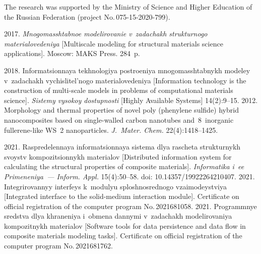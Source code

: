 
\vspace*{-16pt}

\Ack
\noindent
The research was supported by the Ministry of Science and Higher Education of the Russian 
Federation (project No.\,075-15-2020-799).





  \begin{multicols}{2}

\renewcommand{\bibname}{\protect\rmfamily References}

{\small\frenchspacing
 {%
 \begin{thebibliography}{9}
 2017. \textit{Mnogomasshtabnoe modelirovanie v~zadachakh strukturnogo 
materialovedeniya} [Multiscale modeling for structural materials science applications]. Moscow: 
MAKS Press. 284~p.

\vspace*{-2pt}

 2018. In\-for\-ma\-tsi\-on\-naya tekh\-no\-lo\-giya po\-stro\-eniya mno\-go\-mas\-shtab\-nykh 
mo\-de\-ley v~za\-da\-chakh vy\-chis\-li\-tel'\-no\-go ma\-te\-ri\-a\-lo\-ve\-de\-niya 
[Information technology is the construction 
of multi-scale models in problems of computational materials science]. \textit{Sistemy vysokoy 
dostupnosti} [Highly Available Systems] 14(2):9--15.
2012. Morphology and thermal properties of novel poly (phenylene sulfide) hybrid nanocomposites 
based on single-walled carbon nanotubes and~8~inorganic fullerene-like WS~2 nanoparticles. 
\textit{J.~Mater. Chem.}  
22(4):1418--1425.
{

}
   2021. 
  Ras\-pre\-de\-len\-naya in\-for\-ma\-tsi\-on\-naya sis\-te\-ma   dlya 
ras\-che\-ta struk\-tur\-nykh svoystv kom\-po\-zi\-tsi\-on\-nykh ma\-te\-ri\-alov 
[Distributed information system for 
calculating the structural properties of composite materials]. \textit{Informatika i~ee Primeneniya~--- 
Inform. Appl.} 15(4):50--58. doi: 10.14357/19922264210407.
   2021. In\-teg\-ri\-ro\-van\-nyy in\-ter\-feys k~mo\-du\-lyu 
  splosh\-no\-sred\-no\-go 
vza\-imo\-dey\-stviya [Integrated interface to the solid-medium interaction module]. Certificate on official 
registration of the computer program No.\,2021681058.
   2021. Pro\-gram\-mnye sred\-st\-va dlya khra\-ne\-niya 
  i~ob\-me\-na dan\-ny\-mi  v~za\-da\-chakh mo\-de\-li\-ro\-va\-niya kom\-po\-zit\-nykh ma\-te\-ri\-a\-lov 
  [Software tools for data persistence and data flow in 
composite materials modeling tasks]. Certificate on official registration of the computer program 
No.\,2021681762.
\end{thebibliography}

}}
\end{multicols}
